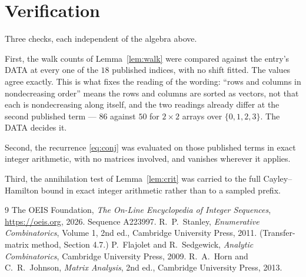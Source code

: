 \documentclass[11pt,a4paper]{article}
\theoremstyle{plain}
\theoremstyle{definition}
\begin{document}
\section{Verification}

Three checks, each independent of the algebra above.

First, the walk counts of Lemma~\ref{lem:walk} were compared against the entry's DATA at
every one of the $18$ published indices, with no shift fitted. The values agree exactly.
This is what fixes the reading of the wording: ``rows and columns in nondecreasing order''
means the rows and columns are sorted as vectors, not that each is nondecreasing along
itself, and the two readings already differ at the second published term --- $86$ against
$50$ for $2\times2$ arrays over $\{0,1,2,3\}$. The DATA decides it.

Second, the recurrence \eqref{eq:conj} was evaluated on those published terms in exact
integer arithmetic, with no matrices involved, and vanishes wherever it applies.

Third, the annihilation test of Lemma~\ref{lem:crit} was carried to the full
Cayley--Hamilton bound in exact integer arithmetic rather than to a sampled prefix.

\begin{thebibliography}{9}
 The OEIS Foundation, \emph{The On-Line Encyclopedia of Integer
Sequences}, \url{https://oeis.org}, 2026. Sequence A223997.
 R.~P.~Stanley, \emph{Enumerative Combinatorics}, Volume 1, 2nd ed.,
Cambridge University Press, 2011. (Transfer-matrix method, Section 4.7.)
 P.~Flajolet and R.~Sedgewick, \emph{Analytic Combinatorics}, Cambridge
University Press, 2009.
 R.~A.~Horn and C.~R.~Johnson, \emph{Matrix Analysis}, 2nd ed., Cambridge
University Press, 2013.
\end{thebibliography}
\end{document}
